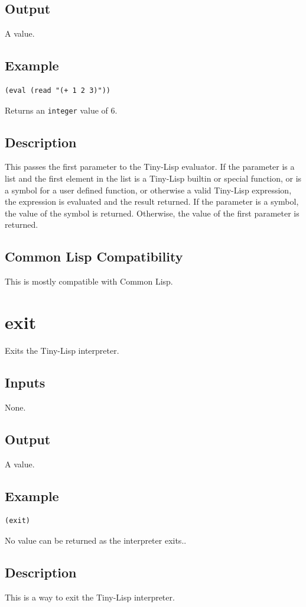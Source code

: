 \documentclass[10pt, openany]{book}
\newcommand{\datatype}[1]{\texttt{#1}}
\newcommand{\tl}{Tiny-Lisp}
\newcommand{\cl}{Common Lisp}
\begin{document}
\subsection{Output}
A value.
\subsection{Example}
\begin{lstlisting}
(eval (read "(+ 1 2 3)"))
\end{lstlisting}
Returns an \datatype{integer} value of 6.
\subsection{Description}
This passes the first parameter to the \tl{} evaluator.  If the parameter is a list and the first element in the list is a \tl{} builtin or special function, or is a symbol for a user defined function, or otherwise a valid \tl{} expression, the expression is evaluated and the result returned.  If the parameter is a symbol, the value of the symbol is returned.  Otherwise, the value of the first parameter is returned.
\subsection{Common Lisp Compatibility}
This is mostly compatible with \cl.

\section{exit}
Exits the \tl{} interpreter.
\subsection{Inputs}
None.
\subsection{Output}
A value.
\subsection{Example}
\begin{lstlisting}
(exit)
\end{lstlisting}
No value can be returned as the interpreter exits..
\subsection{Description}
This is a way to exit the \tl{} interpreter.
\end{document}
